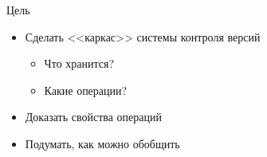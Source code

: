 \begin{frame}{Цель}
  \begin{itemize}
  \item Сделать <<каркас>> системы контроля версий
    \begin{itemize}
    \item Что хранится?
    \item Какие операции?
    \end{itemize}
  \item Доказать свойства операций
  \item Подумать, как можно обобщить
  \end{itemize}
\end{frame}